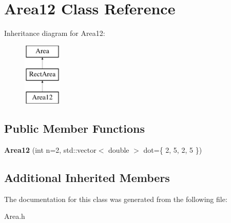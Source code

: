 \hypertarget{class_area12}{}\section{Area12 Class Reference}
\label{class_area12}
Inheritance diagram for Area12\+:\begin{figure}[H]
\begin{center}
\leavevmode
\includegraphics[height=3.000000cm]{class_area12}
\end{center}
\end{figure}
\subsection*{Public Member Functions}
\begin{DoxyCompactItemize}
\item 
\mbox{\label{class_area12_aa1606d3d43a29ab16c47c642d356c5df}} 
{\bfseries Area12} (int n=2, std\+::vector$<$ double $>$ dot=\{ 2, 5, 2, 5 \})
\end{DoxyCompactItemize}
\subsection*{Additional Inherited Members}


The documentation for this class was generated from the following file\+:\begin{DoxyCompactItemize}
\item 
Area.\+h\end{DoxyCompactItemize}
